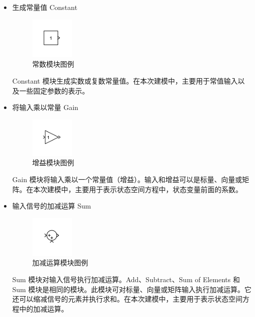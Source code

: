 \begin{itemize}
	
	\item 生成常量值 Constant
	
	\begin{figure}[H]
		\centering
		\includegraphics[width=0.2\textwidth]{fig/simulink/constant_block.png}
		\caption{常数模块图例}\label{fig:constant_block}
	\end{figure}
	
	Constant 模块生成实数或复数常量值。在本次建模中，主要用于常值输入以及一些固定参数的表示。
	
	\item 将输入乘以常量 Gain
	
	\begin{figure}[H]
		\centering
		\includegraphics[width=0.2\textwidth]{fig/simulink/gain_block.png}
		\caption{增益模块图例}\label{fig:gain_block}
	\end{figure}
	
	Gain 模块将输入乘以一个常量值（增益）。输入和增益可以是标量、向量或矩阵。在本次建模中，主要用于表示状态空间方程中，状态变量前面的系数。
	
	\item 输入信号的加减运算 Sum
	
	\begin{figure}[H]
		\centering
		\includegraphics[width=0.2\textwidth]{fig/simulink/sum_block.png}
		\caption{加减运算模块图例}\label{fig:sum_block}
	\end{figure}
	
	Sum 模块对输入信号执行加减运算。Add、Subtract、Sum of Elements 和 Sum 模块是相同的模块。此模块可对标量、向量或矩阵输入执行加减运算。它还可以缩减信号的元素并执行求和。在本次建模中，主要用于表示状态空间方程中的加减运算。
	

\end{itemize}
